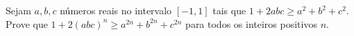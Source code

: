 Sejam \(a,b,c\) números reais no intervalo \([-1,1]\) tais que \(1 + 2abc \geq a^2+b^2+c^2\). Prove que
\(1+2(abc)^n \geq a^{2n} + b^{2n} + c^{2n}\) para todos os inteiros positivos \(n\).
